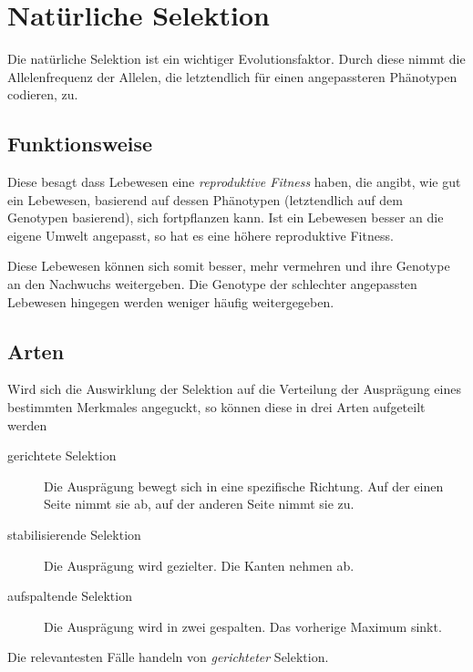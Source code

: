 \documentclass{article}
\begin{document}
\section{Natürliche Selektion}
Die natürliche Selektion ist ein wichtiger Evolutionsfaktor. Durch diese nimmt die Allelenfrequenz der Allelen, die letztendlich für einen angepassteren Phänotypen codieren, zu. 
 
\subsection{Funktionsweise} 
Diese besagt dass Lebewesen eine \emph{reproduktive Fitness} haben, die angibt, wie gut ein Lebewesen, basierend auf dessen Phänotypen (letztendlich auf dem Genotypen basierend), sich fortpflanzen kann. Ist ein Lebewesen besser an die eigene Umwelt angepasst, so hat es eine höhere reproduktive Fitness.
 
Diese Lebewesen können sich somit besser, mehr vermehren und ihre Genotype an den Nachwuchs weitergeben. Die Genotype der schlechter angepassten Lebewesen hingegen werden weniger häufig weitergegeben. 
 
\subsection{Arten}
Wird sich die Auswirklung der Selektion auf die Verteilung der Ausprägung eines bestimmten Merkmales angeguckt, so können diese in drei Arten aufgeteilt werden
\begin{description}
 \item[gerichtete Selektion] Die Ausprägung bewegt sich in eine spezifische Richtung. Auf der einen Seite nimmt sie ab, auf der anderen Seite nimmt sie zu.
 \item[stabilisierende Selektion] Die Ausprägung wird gezielter. Die Kanten nehmen ab.
 \item[aufspaltende Selektion] Die Ausprägung wird in zwei gespalten. Das vorherige Maximum sinkt.
\end{description}
Die relevantesten Fälle handeln von \emph{gerichteter} Selektion.
\end{document}
